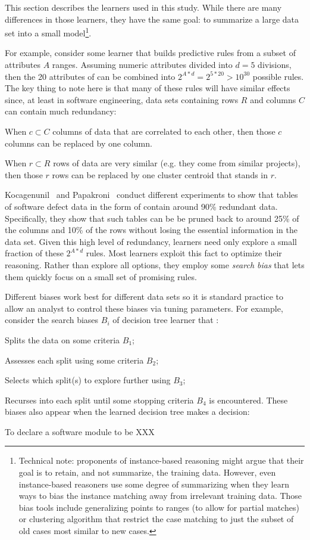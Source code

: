 This section describes the learners used in this study. While there are many differences
in those learners, they have the same goal: to summarize a large data set into a small model\footnote{Technical note: proponents of instance-based reasoning might argue that
their goal is to retain, and not summarize, the training data.
However, 
even instance-based reasoners use some degree of summarizing when they learn
ways to bias the instance matching away from irrelevant training data.
Those bias tools include  generalizing points to ranges (to allow for partial matches)
or  clustering algorithm that restrict the case matching
to just the subset of old cases most similar  to new  cases.}. 

For example,
consider some learner that
builds predictive rules from a subset of  attributes $A$ ranges. Assuming numeric attributes
divided into $d=5$ divisions, then the 20 attributes of  can be combined into 
$2^{A*d} = 2^{5*20} > 10^{30}$
possible rules. The key thing to note here is that many of these rules will have similar effects
since, at least in software engineering, data sets containing rows $R$ and columns $C$ can contain much redundancy:
\bi
\item When $c \subset C$ columns of data that are correlated to each other, then those
$c$ columns can be replaced by one column.
\item When $r \subset R$ rows of data are very similar (e.g. they come from similar projects), 
then those $r$ rows can be replaced
by one cluster centroid that stands in $r$.
\item
Kocagenunil~\cite{me13a} and Papakroni~\cite{papa13} conduct  different experiments
to  show  that tables of software defect data in the form of  contain around 90\% redundant
data. Specifically, they show that such tables can be be pruned back to around
25\% of the columns and 10\% of the rows without losing the essential information in the data set.
\ei
Given this high level of redundancy, learners need only explore a small fraction of these $2^{A*d}$ rules.
Most learners exploit this fact to optimize their reasoning. Rather than explore all options,
they employ some {\em search bias} that lets them quickly focus on a small set of promising rules.

Different biases work best for different data sets so it is standard practice to allow an analyst
to control these biases via tuning parameters. For example, consider the search biases
$B_i$ of decision tree learner that :
\bi
\item Splits the data on some criteria $B_1$;
\item Assesses each split using some criteria $B_2$;
\item Selects which split(s) to explore further using $B_3$;
\item Recurses into each split until some stopping criteria $B_4$ is encountered.
\ei
These biases also appear when the learned decision tree makes a decision:
\bi
\item To declare a software module to be XXX
\ei


